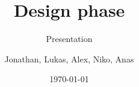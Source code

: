  {
}

\usepackage[utf8]{inputenc}
\usepackage[ngerman]{babel}
 
\usepackage[scaled=.90]{helvet}
\usepackage{courier}

\usepackage{amssymb}
\usepackage{amsmath}
\usepackage{amsthm}

\usepackage{pifont}

\usepackage[T1]{fontenc}


\title{\Huge{Design phase}}
\subtitle{\Large{Presentation}}
\author[Jo Klawitter]{Jonathan, Lukas, Alex, Niko, Anas}
\date{\today}

 
\subject{Design phase - Presentation}




 
\beamertemplatenavigationsymbolsempty


\usepackage{graphicx}
